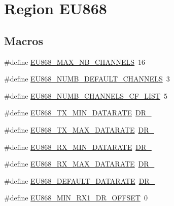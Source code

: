 \hypertarget{group__REGIONEU868}{}\section{Region E\+U868}
\label{group__REGIONEU868}
\subsection*{Macros}
\begin{DoxyCompactItemize}
\item 
\#define \hyperlink{group__REGIONEU868_gaf94c3090ac541fec3c97b2146702d252}{E\+U868\+\_\+\+M\+A\+X\+\_\+\+N\+B\+\_\+\+C\+H\+A\+N\+N\+E\+LS}~16
\item 
\#define \hyperlink{group__REGIONEU868_ga43b13bdefab43add062b907facaef8ba}{E\+U868\+\_\+\+N\+U\+M\+B\+\_\+\+D\+E\+F\+A\+U\+L\+T\+\_\+\+C\+H\+A\+N\+N\+E\+LS}~3
\item 
\#define \hyperlink{group__REGIONEU868_gad3cd171e0308aa36be7231a3fcba36b8}{E\+U868\+\_\+\+N\+U\+M\+B\+\_\+\+C\+H\+A\+N\+N\+E\+L\+S\+\_\+\+C\+F\+\_\+\+L\+I\+ST}~5
\item 
\#define \hyperlink{group__REGIONEU868_ga2df2a8fc7db7e674c3e58de0dd1c90a4}{E\+U868\+\_\+\+T\+X\+\_\+\+M\+I\+N\+\_\+\+D\+A\+T\+A\+R\+A\+TE}~\hyperlink{group__REGION_ga6c4ef966b4f3d5eb7597b087f2b97095}{D\+R\+\_}
\item 
\#define \hyperlink{group__REGIONEU868_ga689495f3ecc7047ff636ec85b3b80ee3}{E\+U868\+\_\+\+T\+X\+\_\+\+M\+A\+X\+\_\+\+D\+A\+T\+A\+R\+A\+TE}~\hyperlink{group__REGION_ga3a06805baf4f00911a3a5d3dbadebf61}{D\+R\+\_}
\item 
\#define \hyperlink{group__REGIONEU868_gaa1bdf9b64650b847961424f9098278fc}{E\+U868\+\_\+\+R\+X\+\_\+\+M\+I\+N\+\_\+\+D\+A\+T\+A\+R\+A\+TE}~\hyperlink{group__REGION_ga6c4ef966b4f3d5eb7597b087f2b97095}{D\+R\+\_}
\item 
\#define \hyperlink{group__REGIONEU868_ga84a09a53f67ea79b84d27a56e51679ab}{E\+U868\+\_\+\+R\+X\+\_\+\+M\+A\+X\+\_\+\+D\+A\+T\+A\+R\+A\+TE}~\hyperlink{group__REGION_ga3a06805baf4f00911a3a5d3dbadebf61}{D\+R\+\_}
\item 
\#define \hyperlink{group__REGIONEU868_ga4053f96ad333ad07d4584f7213e294fa}{E\+U868\+\_\+\+D\+E\+F\+A\+U\+L\+T\+\_\+\+D\+A\+T\+A\+R\+A\+TE}~\hyperlink{group__REGION_ga6c4ef966b4f3d5eb7597b087f2b97095}{D\+R\+\_}
\item 
\#define \hyperlink{group__REGIONEU868_gac803b58ed61f47042654f6e0331b26db}{E\+U868\+\_\+\+M\+I\+N\+\_\+\+R\+X1\+\_\+\+D\+R\+\_\+\+O\+F\+F\+S\+ET}~0

\end{DoxyCompactItemize}
